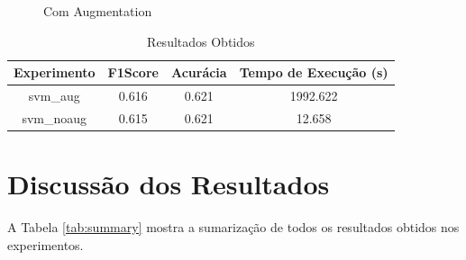 \documentclass[12pt]{article}
\begin{document}
\begin{figure}[!htb]
\begin{minipage}{.47\textwidth}
    \caption{Com Augmentation}\label{fig:experiment_svm_noaug}
  \end{minipage}
\end{figure}

\begin{table}[!htb]
  \centering
  \begin{tabular}{|c|c|c|c|}
    \hline
    \textbf{Experimento} & \textbf{F1Score} & \textbf{Acurácia} & \textbf{Tempo de Execução (s)} \\ \hline
    svm\_aug             & 0.616            & 0.621             & 1992.622                       \\ \hline
    svm\_noaug           & 0.615            & 0.621             & 12.658                         \\ \hline
  \end{tabular}
  \caption{Resultados Obtidos}
  \label{tab:experiment_svm}
\end{table}

\newpage

\section{Discussão dos Resultados}

A Tabela \ref{tab:summary} mostra a sumarização de todos os resultados obtidos nos experimentos.
\end{document}
